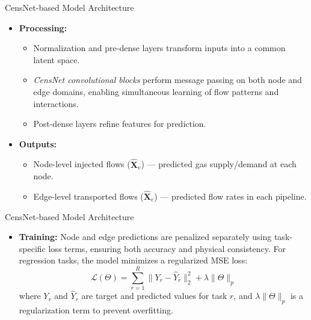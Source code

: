 \documentclass[hyperref={colorlinks,citecolor=blue,linkcolor=blue,urlcolor=blue}]{beamer}
\begin{document}
\begin{frame}{CensNet-based Model Architecture}   
\footnotesize
    \begin{itemize} 
        \item \textbf{Processing:}
        \begin{itemize}
            \item Normalization and pre-dense layers transform inputs into a common latent space.
            \item \emph{CensNet convolutional blocks} perform message passing on both node and edge domains, enabling simultaneous learning of flow patterns and interactions.
            \item Post-dense layers refine features for prediction.
        \end{itemize}
        
        \item \textbf{Outputs:}
        \begin{itemize}
            \item Node-level injected flows ($\hat{\mathbf{X}}_v$) — predicted gas supply/demand at each node.
            \item Edge-level transported flows ($\hat{\mathbf{X}}_e$) — predicted flow rates in each pipeline.
        \end{itemize}
        
   \end{itemize}
\end{frame}


\begin{frame}{CensNet-based Model Architecture}   
\footnotesize
    \begin{itemize} 
       \item \textbf{Training:} Node and edge predictions are penalized separately using task-specific loss terms, ensuring both accuracy and physical consistency. 
        For regression tasks, the model minimizes a regularized MSE loss:
        \[
            \mathcal{L}(\Theta) = \sum_{r=1}^{R} \| Y_r - \hat{Y}_r \|^2_2 + \lambda \|\Theta\|_p
        \]
        where $Y_r$ and $\hat{Y}_r$ are target and predicted values for task $r$, and $\lambda\|\Theta\|_p$ is a regularization term to prevent overfitting.
    \end{itemize}
\end{frame}
\end{document}
